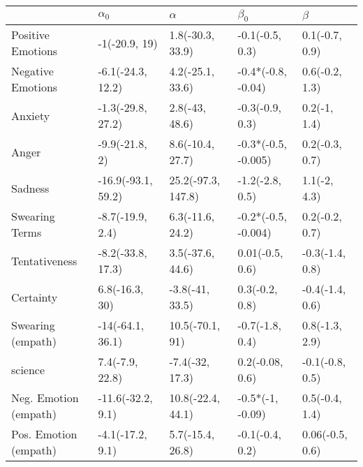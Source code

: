 \begin{tabular}{lllll}
\toprule
{} &          $\alpha_0$ &            $\alpha$ &            $\beta_0$ &          $\beta$ \\
\midrule
Positive Emotions     &       -1(-20.9, 19) &    1.8(-30.3, 33.9) &      -0.1(-0.5, 0.3) &   0.1(-0.7, 0.9) \\
Negative Emotions     &   -6.1(-24.3, 12.2) &    4.2(-25.1, 33.6) &   -0.4*(-0.8, -0.04) &   0.6(-0.2, 1.3) \\
Anxiety               &   -1.3(-29.8, 27.2) &      2.8(-43, 48.6) &      -0.3(-0.9, 0.3) &     0.2(-1, 1.4) \\
Anger                 &      -9.9(-21.8, 2) &    8.6(-10.4, 27.7) &  -0.3*(-0.5, -0.005) &   0.2(-0.3, 0.7) \\
Sadness               &  -16.9(-93.1, 59.2) &  25.2(-97.3, 147.8) &      -1.2(-2.8, 0.5) &     1.1(-2, 4.3) \\
Swearing Terms        &    -8.7(-19.9, 2.4) &    6.3(-11.6, 24.2) &  -0.2*(-0.5, -0.004) &   0.2(-0.2, 0.7) \\
Tentativeness         &   -8.2(-33.8, 17.3) &    3.5(-37.6, 44.6) &      0.01(-0.5, 0.6) &  -0.3(-1.4, 0.8) \\
Certainty             &      6.8(-16.3, 30) &     -3.8(-41, 33.5) &       0.3(-0.2, 0.8) &  -0.4(-1.4, 0.6) \\
Swearing (empath)     &    -14(-64.1, 36.1) &     10.5(-70.1, 91) &      -0.7(-1.8, 0.4) &   0.8(-1.3, 2.9) \\
science               &     7.4(-7.9, 22.8) &     -7.4(-32, 17.3) &      0.2(-0.08, 0.6) &  -0.1(-0.8, 0.5) \\
Neg. Emotion (empath) &   -11.6(-32.2, 9.1) &   10.8(-22.4, 44.1) &     -0.5*(-1, -0.09) &   0.5(-0.4, 1.4) \\
Pos. Emotion (empath) &    -4.1(-17.2, 9.1) &    5.7(-15.4, 26.8) &      -0.1(-0.4, 0.2) &  0.06(-0.5, 0.6) \\
\bottomrule
\end{tabular}

